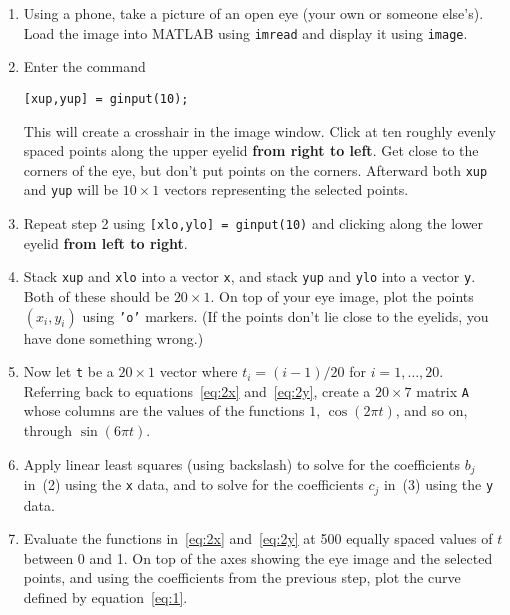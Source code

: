 \documentclass[11pt,twoside]{article}
\begin{document}
\begin{enumerate}
\item Using a phone, take a picture of an open eye (your own or someone else's). Load the image into MATLAB using \texttt{imread} and display it using \texttt{image}. 
\item Enter the command 
\begin{verbatim}
[xup,yup] = ginput(10);
\end{verbatim}
This will create a crosshair in the image window. Click at ten roughly
evenly spaced points along the upper eyelid \textbf{from right to left}. Get close to the corners of the eye, but don't put points on the corners. Afterward both \texttt{xup} and \texttt{yup} will be $10\times 1$ vectors representing the selected points. 
\item Repeat step 2 using \verb+[xlo,ylo] = ginput(10)+ and clicking
  along the lower eyelid \textbf{from left to right}.
\item Stack \texttt{xup} and \texttt{xlo} into a vector \texttt{x},
  and stack \texttt{yup} and \texttt{ylo} into a vector \texttt{y}. Both of these should be $20\times 1$. On top of your eye image, plot the points $(x_i,y_i)$ using \texttt{'o'} markers. (If the points don't lie close to the eyelids, you have done something wrong.)  
\item Now let \texttt{t} be a $20\times 1$ vector where $t_i=(i-1)/20$ for $i=1,\ldots,20$. Referring back to equations~\eqref{eq:2x} and~\eqref{eq:2y}, create a $20\times 7$ matrix \texttt{A} whose columns are the values of the functions $1$, $\cos(2\pi t)$, and so on, through $\sin(6\pi t)$. 
\item Apply linear least squares (using backslash) to solve for the coefficients $b_j$ in~(2) using the \texttt{x} data, and to solve for the coefficients $c_j$ in~(3) using the \texttt{y} data. 
\item Evaluate the functions in~\eqref{eq:2x} and~\eqref{eq:2y} at 500 equally spaced values of $t$ between 0 and 1. On top of the axes showing the eye image and the selected points, and using the coefficients from the previous step, plot the curve defined by equation~\eqref{eq:1}. 
\end{enumerate}
\end{document}
